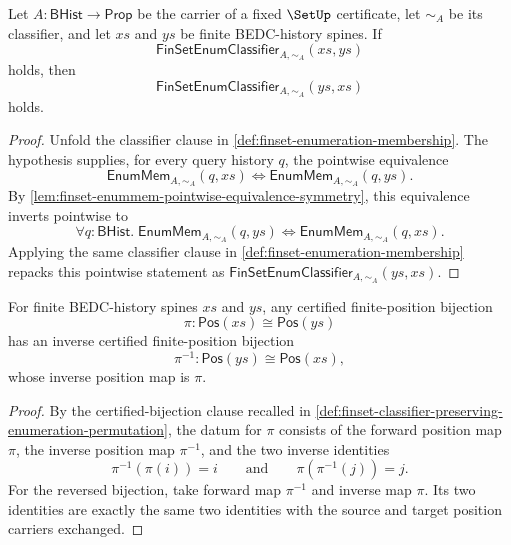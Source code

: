 \begin{theorem}
\label{thm:finset-enumeration-classifier-symmetry}
Let $A:\mathsf{BHist}\to\mathsf{Prop}$ be the carrier of a fixed $\SetUp$ certificate, let $\sim_A$ be its classifier, and let $xs$ and $ys$ be finite BEDC-history spines. If
$$
\mathsf{FinSetEnumClassifier}_{A,\sim_A}(xs,ys)
$$
holds, then
$$
\mathsf{FinSetEnumClassifier}_{A,\sim_A}(ys,xs)
$$
holds.
\end{theorem}
\begin{proof}
Unfold the classifier clause in \autoref{def:finset-enumeration-membership}. The hypothesis supplies, for every query history $q$, the pointwise equivalence
$$
\mathsf{EnumMem}_{A,\sim_A}(q,xs)
\Longleftrightarrow
\mathsf{EnumMem}_{A,\sim_A}(q,ys).
$$
By \autoref{lem:finset-enummem-pointwise-equivalence-symmetry}, this equivalence inverts pointwise to
$$
\forall q:\mathsf{BHist}.\;
\mathsf{EnumMem}_{A,\sim_A}(q,ys)
\Longleftrightarrow
\mathsf{EnumMem}_{A,\sim_A}(q,xs).
$$
Applying the same classifier clause in \autoref{def:finset-enumeration-membership} repacks this pointwise statement as $\mathsf{FinSetEnumClassifier}_{A,\sim_A}(ys,xs)$.
\end{proof}

\begin{lemma}
\label{lem:finset-enum-position-bijection-inversion}
For finite BEDC-history spines $xs$ and $ys$, any certified finite-position bijection
$$
\pi:\mathsf{Pos}(xs)\cong\mathsf{Pos}(ys)
$$
has an inverse certified finite-position bijection
$$
\pi^{-1}:\mathsf{Pos}(ys)\cong\mathsf{Pos}(xs),
$$
whose inverse position map is $\pi$.
\end{lemma}
\begin{proof}
By the certified-bijection clause recalled in \autoref{def:finset-classifier-preserving-enumeration-permutation}, the datum for $\pi$ consists of the forward position map $\pi$, the inverse position map $\pi^{-1}$, and the two inverse identities
$$
\pi^{-1}(\pi(i))=i
\qquad\text{and}\qquad
\pi(\pi^{-1}(j))=j.
$$
For the reversed bijection, take forward map $\pi^{-1}$ and inverse map $\pi$. Its two identities are exactly the same two identities with the source and target position carriers exchanged.
\end{proof}

